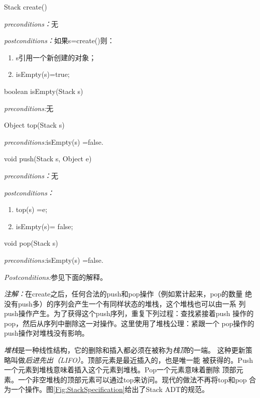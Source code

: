 \begin{figure*}[!t]
\colorbox[rgb]{0.9, 0.9, 0.9}{Stack create()}

\emph{preconditions：}无

\emph{postconditions：}如果s=create()则：
\begin{enumerate}
\item s引用一个新创建的对象；
\item isEmpty(s)=true;
\end{enumerate}

\colorbox[rgb]{0.9, 0.9, 0.9}{boolean isEmpty(Stack s)}

\emph{preconditions:}无

\colorbox[rgb]{0.9, 0.9, 0.9}{Object top(Stack s)}

\emph{preconditions:}isEmpty(s) =false.

\colorbox[rgb]{0.9, 0.9, 0.9}{void push(Stack s, Object e)}

\emph{preconditions：}无

\emph{postconditions：}
\begin{enumerate}
\item top(s) =e;
\item isEmpty(s)= false;
\end{enumerate}

\colorbox[rgb]{0.9, 0.9, 0.9}{void pop(Stack s)}

\emph{preconditions:}isEmpty(s) =false.

\emph{Postconditions:}参见下面的解释。

\emph{注解：}在create之后，任何合法的push和pop操作（例如累计起来，pop的数量
绝没有push多）的序列会产生一个有同样状态的堆栈，这个堆栈也可以由一系
列push操作产生。为了获得这个push序列，重复下列过程：查找紧接着push
操作的pop，然后从序列中删除这一对操作。这里使用了堆栈公理：紧跟一个
pop操作的push操作对堆栈没有影响。

    \caption{堆栈ADT的规范。构造函数是create；isEmpty和top是存取函数；push和pop是处理函数。类中比\textbf{Object}一般的节点的规范以类似的方法定义。}
    \label{Fig:StackSpecification}
\end{figure*}


\emph{堆栈}是一种线性结构，它的删除和插入都必须在被称为\emph{栈顶}的一端。
这种更新策略叫做\emph{后进先出（LIFO）}。顶部元素是最近插入的，也是唯一能
被获得的。Push一个元素到堆栈意味着插入这个元素到堆栈。Pop一个元素意味着删除
顶部元素。一个非空堆栈的顶部元素可以通过top来访问。现代的做法不再将top和pop
合为一个操作。图\ref{Fig:StackSpecification}给出了Stack ADT的规范。

